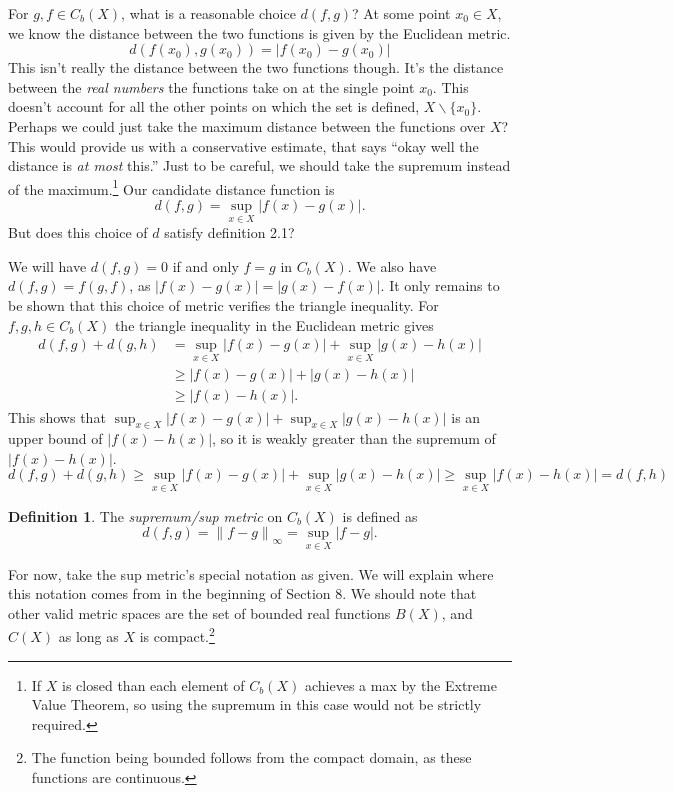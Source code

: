 \documentclass{article}
\newcommand{\norm}[1]{\left\lVert#1\right\rVert}
\theoremstyle{definition}
\newtheorem{definition}{Definition}[section]
\begin{document}
	For $ g,f\in C_b(X) $, what is a reasonable choice $ d(f,g) $? At some point $ x_0\in X $, we know the distance between the two functions is given by the Euclidean metric. $$d(f(x_0),g(x_0))=|f(x_0)-g(x_0)| $$ This isn't really the distance between the two functions though. It's the distance between the \textit{real numbers} the functions take on at the single point $ x_0 $. This doesn't account for all the other points on which the set is defined, $ X\backslash\{x_0\} $. Perhaps we could just take the maximum distance between the functions over $ X $? This would provide us with a conservative estimate, that says ``okay well the distance is \textit{at most} this.'' Just to be careful, we should take the supremum instead of the maximum.\footnote{If $ X $ is closed than each element of $ C_b(X) $ achieves a max by the Extreme Value Theorem, so using the supremum in this case would not be strictly required.} Our candidate distance function is $$d(f,g)=\sup_{x\in X}|f(x)-g(x)| .$$
	But does this choice of $ d $ satisfy definition 2.1?
	
	We will have $ d(f,g)=0 $ if and only $ f=g $ in $ C_b(X) $. We also have $ d(f,g)=f(g,f) $, as $ |f(x)-g(x)|=|g(x)-f(x)|  $. It only remains to be shown that this choice of metric verifies the triangle inequality. For $ f,g,h\in C_b(X) $ the triangle inequality in the Euclidean metric gives  
	\begin{align*}
		d(f,g)+d(g,h)&=\sup_{x\in X}|f(x)-g(x)|+\sup_{x\in X}|g(x)-h(x)|\\
		&\ge |f(x)-g(x)|+|g(x)-h(x)|\\
		&\ge |f(x)-h(x)|.
	\end{align*}
	This shows that $ \sup_{x\in X}|f(x)-g(x)|+\sup_{x\in X}|g(x)-h(x)| $ is an upper bound of $ |f(x)-h(x)| $, so it is weakly greater than the supremum of $ |f(x)-h(x)| $.
	$$	d(f,g)+d(g,h)\ge \sup_{x\in X}|f(x)-g(x)|+\sup_{x\in X}|g(x)-h(x)|\ge \sup_{x\in X} |f(x)-h(x)|=d(f,h) $$
	\begin{definition}\label{def}
		The \textit{\color{red}supremum/sup metric} on $ C_b(X) $ is defined as $$d(f,g)=\norm{f-g}_\infty=\sup_{x\in X}|f-g|. $$
	\end{definition}
	For now, take the sup metric's special notation as given. We will explain where this notation comes from in the beginning of Section 8. We should note that other valid metric spaces are the set of bounded real functions $ B(X) $, and $ C(X) $ as long as $ X $ is compact.\footnote{The function being bounded follows from the compact domain, as these functions are continuous. }
	
\end{document}
